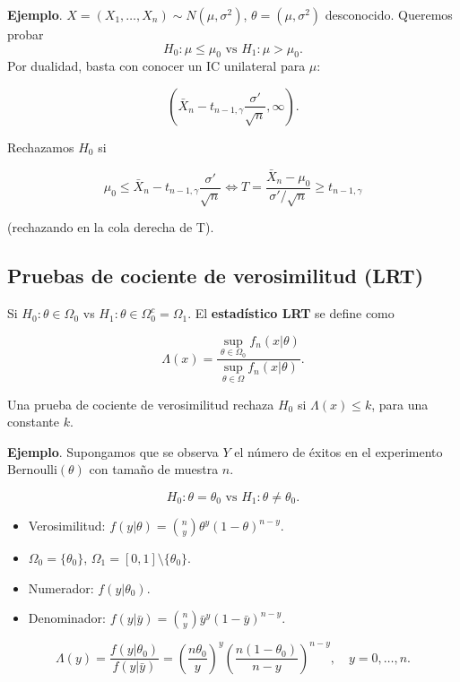 \documentclass[
  12pt,
]{book}
\begin{document}
\textbf{Ejemplo}. \(X = (X_1,\dots, X_n)\sim N(\mu,\sigma^2)\), \(\theta = (\mu,\sigma^2)\) desconocido. Queremos probar
\[ H_0: \mu \leq \mu_0 \text{ vs } H_1: \mu > \mu_0.\]
Por dualidad, basta con conocer un IC unilateral para \(\mu\):

\[ \left(\bar X_n-t_{n-1,\gamma}\dfrac{\sigma'}{\sqrt n},\infty\right).\]

Rechazamos \(H_0\) si

\[\mu_0\leq \bar X_n-t_{n-1,\gamma}\dfrac{\sigma'}{\sqrt n} \Leftrightarrow T = \dfrac{\bar X_n -\mu_0}{\sigma'/\sqrt n}\geq t_{n-1,\gamma}\]

(rechazando en la cola derecha de T).

\hypertarget{pruebas-de-cociente-de-verosimilitud-lrt}{%
\subsection{Pruebas de cociente de verosimilitud (LRT)}\label{pruebas-de-cociente-de-verosimilitud-lrt}}

Si \(H_0:\theta \in \Omega_0\) vs \(H_1: \theta \in \Omega_0^c = \Omega_1\). El \textbf{estadístico LRT} se define como

\[\Lambda (x) = \dfrac{\sup_{\theta\in \Omega_0} f_n(x|\theta)}{\sup_{\theta\in \Omega} f_n(x|\theta)}.\]

Una prueba de cociente de verosimilitud rechaza \(H_0\) si \(\Lambda(x)\leq k\), para una constante \(k\).

\textbf{Ejemplo}. Supongamos que se observa \(Y\) el número de éxitos en el experimento \(\text{Bernoulli}(\theta)\) con tamaño de muestra \(n\).

\[H_0: \theta = \theta_0 \text{ vs } H_1: \theta\ne\theta_0.\]

\begin{itemize}
\item
  Verosimilitud: \(f(y|\theta) = {n\choose y}\theta ^y(1-\theta)^{n-y}\).
\item
  \(\Omega_0 = \{\theta_0\}\), \(\Omega_1 = [0,1]\setminus \{\theta_0\}\).
\item
  Numerador: \(f(y|\theta_0)\).
\item
  Denominador: \(f(y|\bar y) = \displaystyle{n\choose y}{\bar y}^{y}(1-\bar y)^{n-y}\).
\end{itemize}

\[\Lambda(y) = \dfrac{f(y|\theta_0)}{f(y|\bar y)} = \left(\dfrac{n\theta_0}{y}\right)^y\left(\dfrac{n(1-\theta_0)}{n-y}\right)^{n-y}, \quad y=0,\dots,n.\]
\end{document}
